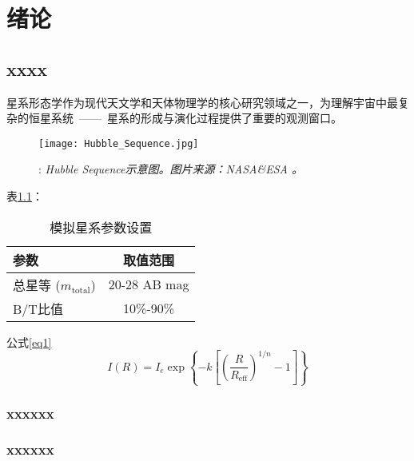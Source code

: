 \chapter{绪论}
\section{xxxx}
星系形态学作为现代天文学和天体物理学的核心研究领域之一，为理解宇宙中最复杂的恒星系统~——~星系的形成与演化过程提供了重要的观测窗口\cite{Kormendy2004,Sandage2005,mo2010}。
\begin{figure}[htbp]
\centering
\texttt{[image: Hubble\_Sequence.jpg]}
\caption{: \emph{Hubble Sequence示意图。图片来源：NASA\&ESA 。}}
\label{fig:hubble_sequence}
\end{figure}

表\ref{tab:simulation_parameters}：
\begin{table}[htbp]
\centering
\caption{模拟星系参数设置}
\label{tab:simulation_parameters}
\begin{tabular}{lc}
\hline
\hline
\textbf{参数} & \textbf{取值范围} \\
\hline
总星等 ($m_{\text{total}}$) & 20-28 AB mag \\
B/T比值 & 10\%-90\% \\
\hline
\hline
\end{tabular}
\end{table}

公式\ref{eq1}
\begin{equation}
I(R) = I_e \exp\left\{-k\left[\left(\frac{R}{R_{\text{eff}}}\right)^{1/n} - 1\right]\right\}
\label{eq1}
\end{equation}


\subsection{xxxxxx}

\subsection{xxxxxx}


